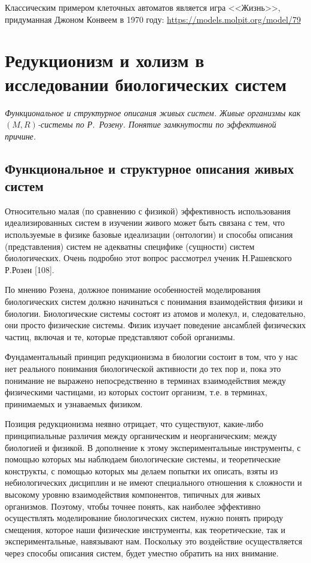 \documentclass[12pt,a4paper,oneside]{book}
\begin{document}
Классическим примером клеточных автоматов является игра <<Жизнь>>, придуманная Джоном Конвеем в 1970 году: \href{https://models.molpit.org/model/79}{https://models.molpit.org/model/79}


\newpage
\section{Редукционизм и холизм в исследовании биологических систем}
{\it Функциональное и структурное описания живых систем. Живые организмы как $(M, R)$-системы по Р.~Розену. Понятие замкнутости по эффективной причине.}

\subsection{Функциональное и структурное описания живых систем}

Относительно малая (по сравнению с физикой) эффективность использования идеализированных систем в изучении живого может быть связана с тем, что используемые в физике базовые идеализации (онтологии) и способы описания (представления) систем не адекватны специфике (сущности) систем биологических. Очень подробно этот вопрос рассмотрел ученик Н.Рашевского Р.Розен [108].

По мнению Розена, должное понимание особенностей моделирования биологических систем должно начинаться с понимания взаимодействия физики и биологии. Биологические системы состоят из атомов и молекул, и, следовательно, они просто физические системы. Физик изучает поведение ансамблей физических частиц, включая и те, которые представляют собой организмы.

Фундаментальный принцип редукционизма в биологии состоит в том, что у нас нет реального понимания биологической активности до тех пор и, пока это понимание не выражено непосредственно в терминах взаимодействия между физическими частицами, из которых состоит организм, т.е. в терминах, принимаемых и узнаваемых физиком.

Позиция редукционизма неявно отрицает, что существуют, какие-либо принципиальные различия между органическим и неорганическим; между биологией и физикой. В дополнение к этому экспериментальные инструменты, с помощью которых мы наблюдаем биологические системы, и теоретические конструкты, с помощью которых мы делаем попытки их описать, взяты из небиологических дисциплин и не имеют специального отношения к сложности и высокому уровню взаимодействия компонентов, типичных для живых организмов. Поэтому, чтобы точнее понять, как наиболее эффективно осуществлять моделирование биологических систем, нужно понять природу смещения, которое наши физические инструменты, как теоретические, так и экспериментальные, навязывают нам. Поскольку это воздействие осуществляется через способы описания систем, будет уместно обратить на них внимание.
\end{document}
